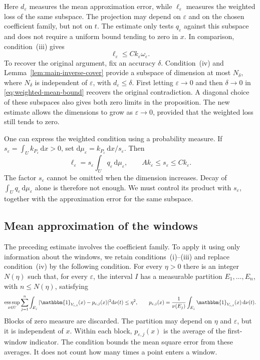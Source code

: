 \documentclass[12pt,reqno,tbtags]{amsart}
\def\d{\mathrm{d}}
\newcommand\1{\mathbbm{1}}
\newcommand{\eps}{\varepsilon}
\def\d{\mathrm{d}}
\begin{document}
Here $d_\eps$ measures the mean approximation error, while $\ell_\eps$
measures the weighted loss of the same subspace. The projection may depend
on $\eps$ and on the chosen coefficient family, but not on $t$.
The estimate only tests $q_\eps$ against this subspace and does not require
a uniform bound tending to zero in $x$. In comparison, condition~(iii) gives
\begin{equation*}
    \ell_\eps\le Ck_\eps\omega_\eps.
\end{equation*}
To recover the original argument, fix an accuracy $\delta$. Condition~(iv) and
Lemma~\ref{lem:main-inverse-cover} provide a subspace of dimension at most
$N_\delta$, where $N_\delta$ is independent of $\eps$, with $d_\eps\le\delta$.
First letting $\eps\to0$ and then $\delta\to0$ in
\eqref{eq:weighted-mean-bound} recovers the original contradiction.
A diagonal choice of these subspaces also gives both zero limits in the
proposition. The new estimate allows the dimensions to grow as $\eps\to0$,
provided that the weighted loss still tends to zero.

One can express the weighted condition using a probability measure.
If $s_\eps=\int_U k_{P_\eps}\,\d x>0$, set
$\d\mu_\eps=k_{P_\eps}\,\d x/s_\eps$. Then
\begin{equation*}
    \ell_\eps=s_\eps\int_U q_\eps\,\d\mu_\eps,
    \qquad Ak_\eps\le s_\eps\le Ck_\eps.
\end{equation*}
The factor $s_\eps$ cannot be omitted when the dimension increases.
Decay of $\int_Uq_\eps\,\d\mu_\eps$ alone is therefore not enough.
We must control its product with $s_\eps$, together with the approximation
error for the same subspace.

\subsection{Mean approximation of the windows}

The preceding estimate involves the coefficient family. To apply it using
only information about the windows, we retain conditions~(i)--(iii) and
replace condition~(iv) by the following condition.
For every $\eta>0$ there is an integer $N(\eta)$ such that, for every $\eps$,
the interval $I$ has a measurable partition $E_1,\ldots,E_n$, with
$n\le N(\eta)$, satisfying
\begin{equation}\label{eq:mean-window-partition}
    \operatorname*{ess\,sup}_{x\in U}
    \sum_{j=1}^{n}\int_{E_j}
    |\1_{V_{\eps,t}}(x)-p_{\eps,j}(x)|^2\d\nu(t)\le\eta^2,
    \qquad
    p_{\eps,j}(x)=\frac1{\nu(E_j)}
      \int_{E_j}\1_{V_{\eps,t}}(x)\,\d\nu(t).
\end{equation}
Blocks of zero measure are discarded. The partition may depend on $\eta$
and $\eps$, but it is independent of $x$.
Within each block, $p_{\eps,j}(x)$ is the average of the first-window indicator.
The condition bounds the mean square error from these averages.
It does not count how many times a point enters a window.
\end{document}
